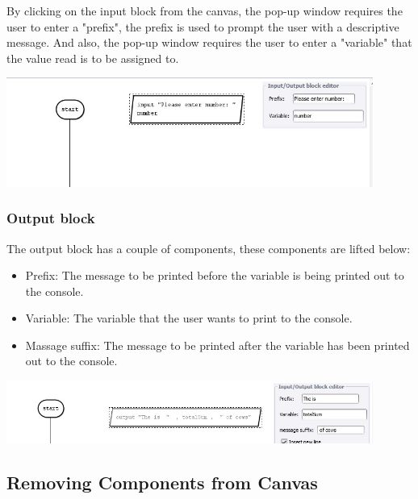 \documentclass[11pt,a4paper,titlepage]{article}
\begin{document}
	By clicking on the input block from the canvas, the pop-up window requires the user to enter a "prefix", the prefix is used to prompt the user with a descriptive message. And also, the pop-up window requires the user to enter a "variable" that the value read is to be assigned to. \newline \newline
	
	\includegraphics[width=12cm]{images/editInput.jpg} \newline
	
	\subsubsection{Output block}
	
	The output block has a couple of components, these components are lifted below:
	\begin{itemize}
	\item Prefix: \newline
	The message to be printed before the variable is being printed out to the console.
	\item Variable: \newline
	The variable that the user wants to print to the console.
	\item Massage suffix: \newline
	The message to be printed after the variable has been printed out to the console. \newline
	\end{itemize}
		
	\includegraphics[width=12cm]{images/editOutput.jpg} \newline
				
	\subsection{Removing Components from Canvas}
	
\end{document}

